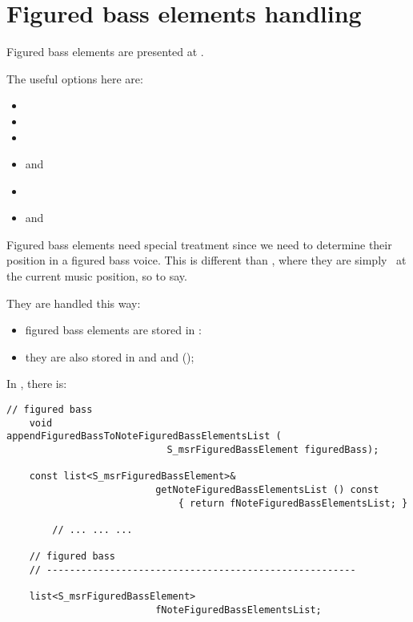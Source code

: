 
\chapter{Figured bass elements handling}\label{Figured bass elements handling}

Figured bass elements are presented at .

The useful options here are:
\begin{itemize}
\item {}
\item {}
\item {}
\item {} and 
\item {}
\item {} and 
\end{itemize}

Figured bass elements need special treatment since we need to determine their position in a figured bass voice. This is different than \mxml, where they are simply \drawn\ at the current music position, so to say.

They are handled this way:
\begin{itemize}
\item figured bass elements are stored in :
\item they are also stored in  and  and  (\denorm);
\end{itemize}

In , there is:
\begin{lstlisting}[language=CPlusPlus]
    // figured bass
    void                  appendFiguredBassToNoteFiguredBassElementsList (
                            S_msrFiguredBassElement figuredBass);

    const list<S_msrFiguredBassElement>&
                          getNoteFiguredBassElementsList () const
                              { return fNoteFiguredBassElementsList; }

		// ... ... ...

    // figured bass
    // ------------------------------------------------------

    list<S_msrFiguredBassElement>
                          fNoteFiguredBassElementsList;
\end{lstlisting}


